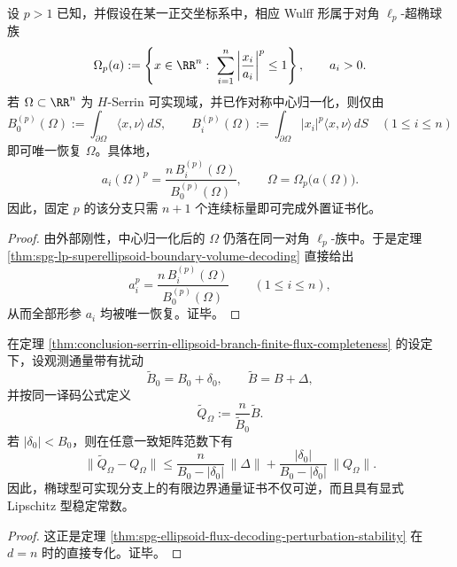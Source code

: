 \begin{theorem}\label{thm:conclusion-serrin-lp-branch-nplusone-flux-completeness}
设 \(p>1\) 已知，并假设在某一正交坐标系中，相应 Wulff 形属于对角 \(\ell_p\)-超椭球族
\[
\Omega_p(a):=
\left\{
x\in\RR^n:\ \sum_{i=1}^n\left|\frac{x_i}{a_i}\right|^p\le 1
\right\},
\qquad
a_i>0.
\]
若 \(\Omega\subset\RR^n\) 为 \(H\)-Serrin 可实现域，并已作对称中心归一化，则仅由
\[
B_0^{(p)}(\Omega):=\int_{\partial\Omega}\langle x,\nu\rangle\,dS,
\qquad
B_i^{(p)}(\Omega):=\int_{\partial\Omega}|x_i|^p\langle x,\nu\rangle\,dS
\quad(1\le i\le n)
\]
即可唯一恢复 \(\Omega\)。具体地，
\[
a_i(\Omega)^p=\frac{n\,B_i^{(p)}(\Omega)}{B_0^{(p)}(\Omega)},
\qquad
\Omega=\Omega_p\bigl(a(\Omega)\bigr).
\]
因此，固定 \(p\) 的该分支只需 \(n+1\) 个连续标量即可完成外置证书化。
\end{theorem}
\begin{proof}
由外部刚性，中心归一化后的 \(\Omega\) 仍落在同一对角 \(\ell_p\)-族中。于是定理 \ref{thm:spg-lp-superellipsoid-boundary-volume-decoding} 直接给出
\[
a_i^p=\frac{n\,B_i^{(p)}(\Omega)}{B_0^{(p)}(\Omega)}
\qquad(1\le i\le n),
\]
从而全部形参 \(a_i\) 均被唯一恢复。证毕。
\end{proof}

\begin{proposition}[椭球型有限通量证书的显式稳定性]\label{prop:conclusion-serrin-ellipsoid-flux-certificate-stability}
在定理 \ref{thm:conclusion-serrin-ellipsoid-branch-finite-flux-completeness} 的设定下，设观测通量带有扰动
\[
\widetilde B_0=B_0+\delta_0,
\qquad
\widetilde B=B+\Delta,
\]
并按同一译码公式定义
\[
\widetilde Q_\Omega:=\frac{n}{\widetilde B_0}\widetilde B.
\]
若 \(|\delta_0|<B_0\)，则在任意一致矩阵范数下有
\[
\|\widetilde Q_\Omega-Q_\Omega\|
\le
\frac{n}{B_0-|\delta_0|}\,\|\Delta\|
+
\frac{|\delta_0|}{B_0-|\delta_0|}\,\|Q_\Omega\|.
\]
因此，椭球型可实现分支上的有限边界通量证书不仅可逆，而且具有显式 Lipschitz 型稳定常数。
\end{proposition}
\begin{proof}
这正是定理 \ref{thm:spg-ellipsoid-flux-decoding-perturbation-stability} 在 \(d=n\) 时的直接专化。证毕。
\end{proof}

